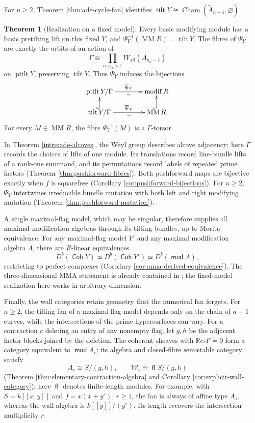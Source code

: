 \documentclass[a4paper,reqno]{amsart}
\def\W{\mathcal{W}}
\DeclareMathOperator{\md}{\mathsf{mod}}
\renewcommand{\mod}{\md}
\DeclareMathOperator{\fl}{\mathsf{fl}}
\DeclareMathOperator{\Coh}{\mathsf{Coh}}
\DeclareMathOperator{\tilt}{tilt}
\DeclareMathOperator{\ptilt}{ptilt}
\DeclareMathOperator{\modif}{modif}
\DeclareMathOperator{\MM}{MM}
\theoremstyle{definition}
\newtheorem{IntroThm}{Theorem}
\begin{document}
For $n\ge2$, Theorem \ref{thm:ade-cycle-fan} identifies $\tilt Y\cong\operatorname{Cham}(\widetilde A_{n-1},\varnothing)$.

\begin{IntroThm}[Realization on a fixed model]\label{intro:pushforward}
Every basic modifying module has a basic pretilting lift on this fixed $Y$, and $\Psi_Y^{-1}(\MM R)=\tilt Y$. The fibres of $\Psi_Y$ are exactly the orbits of an action of
\[
\Gamma\cong\prod_{\alpha:a_\alpha>1}W_{\mathrm{aff}}(A_{a_\alpha-1})
\]
on $\ptilt Y$, preserving $\tilt Y$. Thus $\Psi_Y$ induces the bijections
\[
\xymatrix@C=4em@R=1.4em{
\ptilt Y/\Gamma\ar[r]^-{\overline\Psi_Y}_-{\sim}&\modif R\\
\tilt Y/\Gamma\ar@{^{(}->}[u]\ar[r]^-{\overline\Psi_Y}_-{\sim}
 &\MM R\ar@{^{(}->}[u].
}
\]
For every $M\in\MM R$, the fibre $\Psi_Y^{-1}(M)$ is a $\Gamma$-torsor.
\end{IntroThm}

In Theorem \ref{intro:ade-alcoves}, the Weyl group describes alcove adjacency; here $\Gamma$ records the choices of lifts of one module. Its translations record line-bundle lifts of a rank-one summand, and its permutations record labels of repeated prime factors (Theorem \ref{thm:pushforward-fibres}). Both pushforward maps are bijective exactly when $f$ is squarefree (Corollary \ref{cor:pushforward-bijections}). For $n\ge2$, $\Psi_Y$ intertwines irreducible bundle mutation with both left and right modifying mutation (Theorem \ref{thm:pushforward-mutation}).

A single maximal-flag model, which may be singular, therefore supplies all maximal modification algebras through its tilting bundles, up to Morita equivalence. For any maximal-flag model $Y'$ and any maximal modification algebra $\Lambda$, there are $R$-linear equivalences
\[
D^b(\Coh Y)\simeq D^b(\Coh Y')\simeq D^b(\mod\Lambda),
\]
restricting to perfect complexes (Corollary \ref{cor:mma-derived-equivalence}). The three-dimensional MMA statement is already contained in \cite[Theorem 4.16]{IW}; the fixed-model realization here works in arbitrary dimension.

Finally, the wall categories retain geometry that the numerical fan forgets. For $n\ge2$, the tilting fan of a maximal-flag model depends only on the chain of $n-1$ curves, while the intersections of the prime hypersurfaces can vary. For a contraction $c$ deleting an entry of any nonempty flag, let $g,h$ be the adjacent factor blocks joined by the deletion. The coherent sheaves with $\mathbb Rc_*F=0$ form a category equivalent to $\mod A_c$; its algebra and closed-fibre semistable category satisfy
\[
A_c\cong S/(g,h),\qquad \W_c\simeq\fl S/(g,h)
\]
(Theorem \ref{thm:elementary-contraction-algebra} and Corollary \ref{cor:explicit-wall-category}); here $\fl$ denotes finite-length modules. For example, with $S=k[[x,y]]$ and $f=x(x+y^r)$, $r\ge1$, the fan is always of affine type $A_1$, whereas the wall algebra is $k[[y]]/(y^r)$. Its length recovers the intersection multiplicity $r$.
\end{document}
